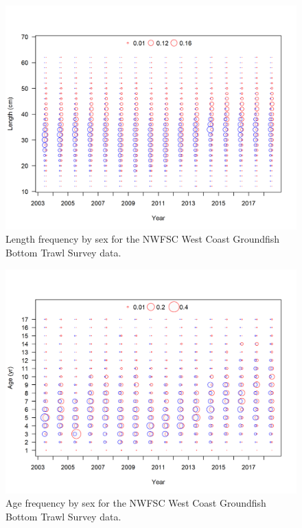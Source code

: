 \documentclass[12pt,]{article}
\begin{document}
\FloatBarrier

\begin{figure}
\centering
\includegraphics{r4ss/plots_mod1/comp_lendat_bubflt7mkt0.png}
\caption{Length frequency by sex for the NWFSC West Coast Groundfish
Bottom Trawl Survey data. \label{fig:nw_len_freq}}
\end{figure}

\FloatBarrier

\begin{figure}
\centering
\includegraphics{r4ss/plots_mod1/comp_gstagedat_bubflt7mkt0.png}
\caption{Age frequency by sex for the NWFSC West Coast Groundfish Bottom
Trawl Survey data. \label{fig:nw_age_freq}}
\end{figure}
\end{document}
